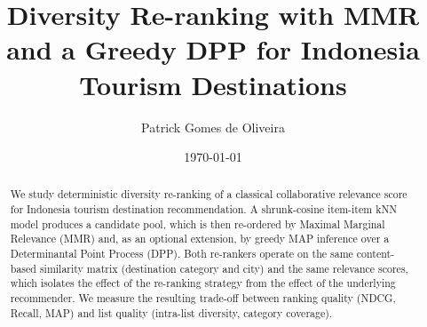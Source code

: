\documentclass[10pt,twocolumn]{article}
\title{Diversity Re-ranking with MMR and a Greedy DPP for Indonesia Tourism Destinations}
\author{Patrick Gomes de Oliveira}
\date{\today}
\begin{document}
\maketitle
\begin{abstract}
We study deterministic diversity re-ranking of a classical collaborative
relevance score for Indonesia tourism destination recommendation. A
shrunk-cosine item-item kNN model produces a candidate pool, which is then
re-ordered by Maximal Marginal Relevance (MMR) and, as an optional
extension, by greedy MAP inference over a Determinantal Point Process
(DPP). Both re-rankers operate on the same content-based similarity matrix
(destination category and city) and the same relevance scores, which
isolates the effect of the re-ranking strategy from the effect of the
underlying recommender. We measure the resulting trade-off between ranking
quality (NDCG, Recall, MAP) and list quality (intra-list diversity,
category coverage).
\end{abstract}









\end{document}
